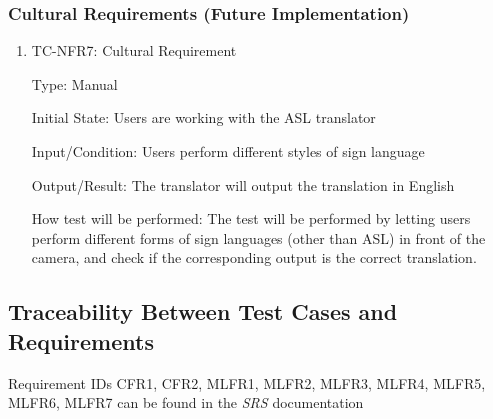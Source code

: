 \documentclass[12pt]{article}
\begin{document}
\subsubsection{Cultural Requirements (Future Implementation)}

\begin{enumerate}

\item{TC-NFR7: Cultural Requirement\\}

Type: Manual

Initial State: Users are working with the ASL translator
					
Input/Condition: Users perform different styles of sign language 
					
Output/Result: The translator will output the translation in English
					
How test will be performed: The test will be performed by letting users perform different forms of sign languages (other than ASL) in front of the camera, and check if the corresponding output is the correct translation.

\end{enumerate}

\newpage

\subsection{Traceability Between Test Cases and Requirements}

Requirement IDs CFR1, CFR2, MLFR1, MLFR2, MLFR3, MLFR4, MLFR5, MLFR6, MLFR7 can be found in the \emph{SRS} \citep{SRS} documentation\\
~\\
\end{document}
